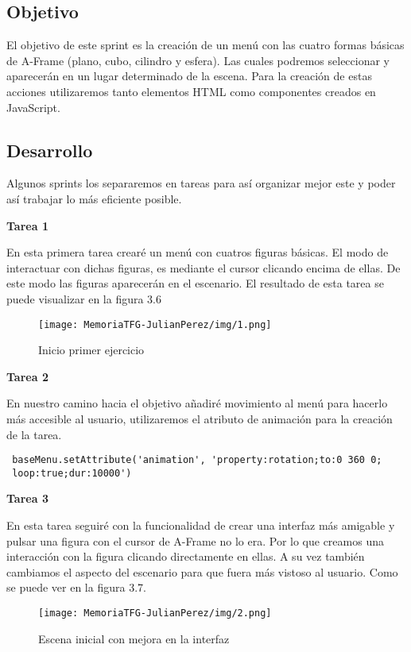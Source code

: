 \documentclass[a4paper, 12pt]{book}
\begin{document}
\subsection{Objetivo}
El objetivo de este sprint es la creación de un menú con las cuatro formas básicas de A-Frame (plano, cubo, cilindro y esfera). Las cuales podremos seleccionar y aparecerán en un lugar determinado de la escena. Para la creación de estas acciones utilizaremos tanto elementos HTML como componentes creados en JavaScript.

\subsection{Desarrollo}
Algunos sprints los separaremos en tareas para así organizar mejor este y poder así trabajar lo más eficiente posible.

\textbf{Tarea 1}

En esta primera tarea crearé un menú con cuatros figuras básicas. El modo de interactuar con dichas figuras, es  mediante el cursor clicando encima de ellas. De este modo las figuras aparecerán en el escenario.
El resultado de esta tarea se puede visualizar en la figura 3.6
\begin{figure}[H]
  \centering
  \texttt{[image: MemoriaTFG-JulianPerez/img/1.png]}
  \caption{Inicio primer ejercicio}\label{scrum}
\end{figure}

\textbf{Tarea 2}

En nuestro camino hacia el objetivo añadiré movimiento al menú para hacerlo más accesible al usuario, utilizaremos el atributo  de animación para la creación de la tarea.
\begin{verbatim}
 baseMenu.setAttribute('animation', 'property:rotation;to:0 360 0;
 loop:true;dur:10000')   
\end{verbatim}

\textbf{Tarea 3}

En esta tarea seguiré con la funcionalidad de crear una interfaz más amigable y pulsar una figura con el cursor de A-Frame no lo era. Por lo que creamos una interacción con la figura clicando directamente en ellas. A su vez también cambiamos el aspecto del escenario para que fuera más vistoso al usuario. Como se puede ver en la figura 3.7.
         \begin{figure}[H]
  \centering
  \texttt{[image: MemoriaTFG-JulianPerez/img/2.png]}
  \caption{Escena inicial con mejora en la interfaz}\label{scrum}
\end{figure}
\end{document}
